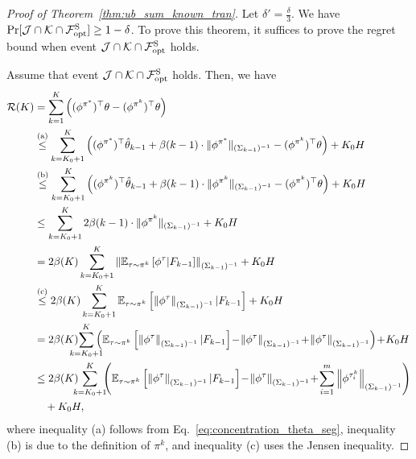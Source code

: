 \begin{proof}[Proof of Theorem~\ref{thm:ub_sum_known_tran}]
	Let $\delta'=\frac{\delta}{3}$. We have $\Pr[\mathcal{J} \cap \mathcal{K} \cap \mathcal{F}^{\textup{S}}_{\textup{opt}}] \geq 1-\delta$.
	To prove this theorem, it suffices to prove the regret bound when event $\mathcal{J} \cap \mathcal{K} \cap \mathcal{F}^{\textup{S}}_{\textup{opt}}$ holds. 
	
	Assume that event $\mathcal{J} \cap \mathcal{K} \cap \mathcal{F}^{\textup{S}}_{\textup{opt}}$ holds.
	Then, we have
	\begin{align}
		\cR(K) &= \sum_{k=1}^{K} \sbr{ (\phi^{\pi^*})^\top \theta - (\phi^{\pi^k})^\top \theta }
		\nonumber\\
		&\overset{\textup{(a)}}{\leq} \sum_{k=K_0+1}^{K} \sbr{ (\phi^{\pi^*})^\top \hat{\theta}_{k-1} + \beta(k-1) \cdot \| \phi^{\pi^*} \|_{(\Sigma_{k-1})^{-1}}  - (\phi^{\pi^k})^\top \theta } + K_0 H
		\nonumber\\
		&\overset{\textup{(b)}}{\leq} \sum_{k=K_0+1}^{K} \sbr{ (\phi^{\pi^k})^\top \hat{\theta}_{k-1} + \beta(k-1) \cdot \| \phi^{\pi^k} \|_{(\Sigma_{k-1})^{-1}}  - (\phi^{\pi^k})^\top \theta } + K_0 H
		\nonumber\\
		&\leq \sum_{k=K_0+1}^{K} 2 \beta(k-1) \cdot \| \phi^{\pi^k} \|_{(\Sigma_{k-1})^{-1}} + K_0 H
		\nonumber\\
		&=  2 \beta(K)  \sum_{k=K_0+1}^{K} \nbr{ \ex_{\tau \sim \pi^k}\mbr{\phi^{\tau}| F_{k-1}} }_{(\Sigma_{k-1})^{-1}} + K_0 H
		\nonumber\\
		&\overset{\textup{(c)}}{\leq}  2 \beta(K)  \sum_{k=K_0+1}^{K} \ex_{\tau \sim \pi^k}\mbr{ \nbr{ \phi^{\tau}}_{(\Sigma_{k-1})^{-1}} | F_{k-1}} + K_0 H
		\nonumber\\
		&=  2 \beta(K) \!\!\!\!\!\! \sum_{k=K_0+1}^{K} \!\!\!\!\! \sbr{ \ex_{\tau \sim \pi^k}\mbr{ \nbr{ \phi^{\tau}}_{(\Sigma_{k-1})^{-1}} | F_{k-1}} \!-\! \nbr{ \phi^{\tau}}_{(\Sigma_{k-1})^{-1}} \!+\! \nbr{ \phi^{\tau}}_{(\Sigma_{k-1})^{-1}} } \!+\! K_0 H
		\nonumber\\
		&\leq  2 \beta(K) \!\!\!\! \sum_{k=K_0+1}^{K} \!\!\! \sbr{ \ex_{\tau \sim \pi^k}\mbr{ \nbr{ \phi^{\tau}}_{(\Sigma_{k-1})^{-1}} | F_{k-1}} \!-\! \nbr{ \phi^{\tau}}_{(\Sigma_{k-1})^{-1}} \!+\! \sum_{i=1}^{m} \nbr{ \phi^{\tau^k_i}}_{(\Sigma_{k-1})^{-1}} } 
		\nonumber\\
		&\quad + K_0 H , \label{eq:regret_decomposition_seg}
	\end{align}
	where inequality (a) follows from Eq.~\eqref{eq:concentration_theta_seg}, inequality (b) is due to the definition of $\pi^k$, and inequality (c) uses the Jensen inequality.
	

\end{proof}
